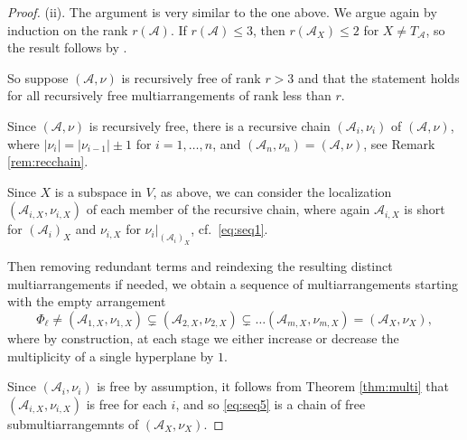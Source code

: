 \begin{proof}
(ii).
The argument is very similar to the one above.
We argue again by induction on the rank $r({{\mathcal A}})$.
If $r({{\mathcal A}}) \le 3$, then 
$r({{\mathcal A}}_X) \le 2$ for $X \ne T_{{\mathcal A}}$, so
the result follows by 
\cite[Cor.\ 7]{ziegler:multiarrangements}.

So suppose $({{\mathcal A}}, \nu)$ is recursively free of rank $r > 3$
and that the statement holds for 
all recursively free multiarrangements of rank less than $r$.

Since $({{\mathcal A}}, \nu)$ is recursively free, there is a 
recursive chain $({{\mathcal A}}_i, \nu_i)$ of $({{\mathcal A}}, \nu)$, where 
$|\nu_i| = |\nu_{i-1}| \pm 1$ for $i = 1, \ldots, n$, 
and $({{\mathcal A}}_n, \nu_n) = ({{\mathcal A}}, \nu)$,
see Remark \ref{rem:recchain}.

Since $X$ is a subspace in $V$, as above, 
we can consider the localization 
$({{\mathcal A}}_{i,X}, \nu_{i,X})$ of each member of the recursive chain,
where again 
${{\mathcal A}}_{i,X}$ is short for $({{\mathcal A}}_i)_X$
and $\nu_{i,X}$ for $\nu_i|_{({{\mathcal A}}_i)_X}$,
cf.~\eqref{eq:seq1}.

Then removing redundant 
terms and reindexing the resulting distinct multiarrangements
if needed, 
we obtain a sequence of multiarrangements starting with the 
empty arrangement 
\begin{equation}
\label{eq:seq5}
\Phi_\ell \ne 
\left({{\mathcal A}}_{1,X}, \nu_{1,X}\right) \subsetneq \left({{\mathcal A}}_{2,X}, \nu_{2,X}\right) 
\subsetneq  \ldots \left({{\mathcal A}}_{m,X}, \nu_{m,X}\right) = \left({{\mathcal A}}_X, \nu_X\right),
\end{equation}
where by construction, at each stage we either 
increase or decrease the multiplicity of a single hyperplane by $1$.

Since $({{\mathcal A}}_i, \nu_i)$ is free by assumption, 
it follows from Theorem \ref{thm:multi} that  $({{\mathcal A}}_{i,X}, \nu_{i,X})$ 
is free for each $i$, and so \eqref{eq:seq5} is a chain of 
free submultiarrangemnts of $({{\mathcal A}}_X, \nu_X)$.


\end{proof}
